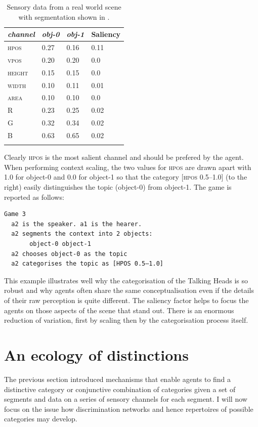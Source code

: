 \begin{table}
\begin{center}
\begin{tabular}{ l  l  l  l }
\lsptoprule
{\itshape channel}& {\itshape obj-0} & {\itshape obj-1} & Saliency\\ \midrule
\textsc{hpos} & 0.27 & 0.16 & 0.11\\ 
\textsc{vpos} & 0.20 & 0.20 & 0.0\\ 
\textsc{height} & 0.15 & 0.15 & 0.0\\ 
\textsc{width} & 0.10 & 0.11 & 0.01\\ 
\textsc{area} & 0.10 & 0.10 & 0.0\\ 
R & 0.23 & 0.25 & 0.02\\ 
G & 0.32 & 0.34  & 0.02\\ 
B & 0.63 & 0.65 & 0.02\\ 
\lspbottomrule
\end{tabular}
\caption{\label{tab:t-real}Sensory data from a real world scene with segmentation shown in .}
\end{center}
\end{table}
Clearly \textsc{hpos} is the most salient channel and should be 
prefered by the agent. When performing context scaling, 
the two values for \textsc{hpos} are drawn apart with 1.0 for object-0 and 
0.0 for object-1 so that the category [\textsc{hpos} 0.5–1.0] (to the 
right) easily distinguishes the topic (object-0) from
object-1. The game is reported as follows: 
\begin{verbatim}
Game 3 
  a2 is the speaker. a1 is the hearer. 
  a2 segments the context into 2 objects: 
       object-0 object-1
  a2 chooses object-0 as the topic 
  a2 categorises the topic as [HPOS 0.5–1.0]
\end{verbatim}
This example illustrates well why the categorisation 
of the Talking Heads is so robust and why agents 
often share the same conceptualisation even if the details  
of their raw perception is quite different. 
The saliency factor helps to focus the agents on those
aspects of the scene that stand out. There is 
an enormous reduction of variation, first by scaling then by 
the categorisation process itself. 

\section{An ecology of distinctions}

The previous section introduced mechanisms that 
enable agents to find a distinctive category or
conjunctive combination of categories given 
a set of segments and data on a series of sensory 
channels for each segment. I will now focus on the 
issue how discrimination networks and hence
repertoires of possible categories may develop. 

